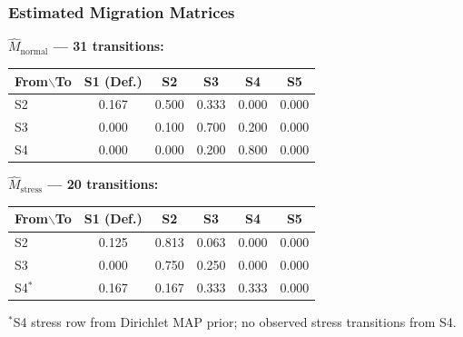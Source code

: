 \documentclass{beamer}
\newcommand{\ts}{\footnotesize}
\begin{document}
\begin{frame}
    \frametitle{Estimated Migration Matrices}
    {\ts
    \textbf{$\hat{M}_{\text{normal}}$ --- 31 transitions:}
    \vspace{0.1em}
    \begin{center}
    \begin{tabular}{@{}lccccc@{}}
        \toprule
        \textbf{From$\backslash$To} & \textbf{S1 (Def.)} & \textbf{S2} & \textbf{S3} & \textbf{S4} & \textbf{S5} \\
        \midrule
        S2 & 0.167 & 0.500 & 0.333 & 0.000 & 0.000 \\
        S3 & 0.000 & 0.100 & 0.700 & 0.200 & 0.000 \\
        S4 & 0.000 & 0.000 & 0.200 & 0.800 & 0.000 \\
        \bottomrule
    \end{tabular}
    \end{center}
    \vspace{0.3em}
    \textbf{$\hat{M}_{\text{stress}}$ --- 20 transitions:}
    \vspace{0.1em}
    \begin{center}
    \begin{tabular}{@{}lccccc@{}}
        \toprule
        \textbf{From$\backslash$To} & \textbf{S1 (Def.)} & \textbf{S2} & \textbf{S3} & \textbf{S4} & \textbf{S5} \\
        \midrule
        S2   & 0.125 & 0.813 & 0.063 & 0.000 & 0.000 \\
        S3   & 0.000 & 0.750 & 0.250 & 0.000 & 0.000 \\
        S4$^*$ & 0.167 & 0.167 & 0.333 & 0.333 & 0.000 \\
        \bottomrule
    \end{tabular}
    \end{center}
    }
    {\scriptsize $^*$S4 stress row from Dirichlet MAP prior; no observed stress transitions from S4.}
\end{frame}
\end{document}
